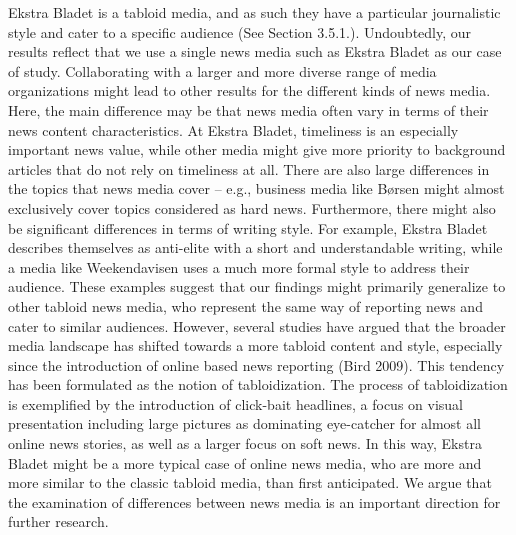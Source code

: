 \documentclass[
]{article}
\begin{document}
Ekstra Bladet is a tabloid media, and as such they have a particular
journalistic style and cater to a specific audience (See Section
3.5.1.). Undoubtedly, our results reflect that we use a single news
media such as Ekstra Bladet as our case of study. Collaborating with a
larger and more diverse range of media organizations might lead to other
results for the different kinds of news media. Here, the main difference
may be that news media often vary in terms of their news content
characteristics. At Ekstra Bladet, timeliness is an especially important
news value, while other media might give more priority to background
articles that do not rely on timeliness at all. There are also large
differences in the topics that news media cover -- e.g., business media
like Børsen might almost exclusively cover topics considered as hard
news. Furthermore, there might also be significant differences in terms
of writing style. For example, Ekstra Bladet describes themselves as
anti-elite with a short and understandable writing, while a media like
Weekendavisen uses a much more formal style to address their audience.
These examples suggest that our findings might primarily generalize to
other tabloid news media, who represent the same way of reporting news
and cater to similar audiences. However, several studies have argued
that the broader media landscape has shifted towards a more tabloid
content and style, especially since the introduction of online based
news reporting (Bird 2009). This tendency has been formulated as the
notion of tabloidization. The process of tabloidization is exemplified
by the introduction of click-bait headlines, a focus on visual
presentation including large pictures as dominating eye-catcher for
almost all online news stories, as well as a larger focus on soft news.
In this way, Ekstra Bladet might be a more typical case of online news
media, who are more and more similar to the classic tabloid media, than
first anticipated. We argue that the examination of differences between
news media is an important direction for further research.
\end{document}
